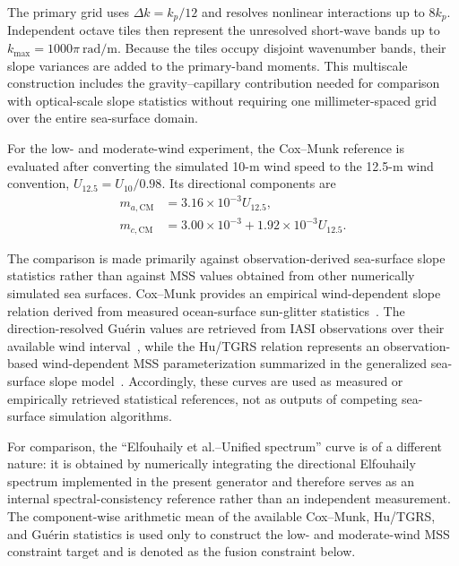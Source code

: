 The primary grid uses $\Delta k=k_p/12$ and resolves nonlinear interactions up to $8k_p$. Independent octave tiles then represent the unresolved short-wave bands up to $k_{\max}=1000\pi~\mathrm{rad/m}$. Because the tiles occupy disjoint wavenumber bands, their slope variances are added to the primary-band moments. This multiscale construction includes the gravity--capillary contribution needed for comparison with optical-scale slope statistics without requiring one millimeter-spaced grid over the entire sea-surface domain.

For the low- and moderate-wind experiment, the Cox--Munk reference is evaluated after converting the simulated 10-m wind speed to the 12.5-m wind convention, $U_{12.5}=U_{10}/0.98$. Its directional components are~\cite{cox1954measurement}
\begin{equation}
\begin{aligned}
m_{a,\mathrm{CM}}&=3.16\times10^{-3}U_{12.5},\\
m_{c,\mathrm{CM}}&=3.00\times10^{-3}
+1.92\times10^{-3}U_{12.5}.
\end{aligned}
\label{eq:cox_munk_directional_mss}
\end{equation}

The comparison is made primarily against observation-derived sea-surface
slope statistics rather than against MSS values obtained from other
numerically simulated sea surfaces. Cox--Munk provides an empirical
wind-dependent slope relation derived from measured ocean-surface
sun-glitter statistics~\cite{cox1954measurement}. The direction-resolved
Gu\'erin values are retrieved from IASI observations over their available
wind interval~\cite{guerin2023seasurfaceslope}, while the Hu/TGRS relation
represents an observation-based wind-dependent MSS parameterization
summarized in the generalized sea-surface slope model~\cite{gao2024generalized}.
Accordingly, these curves are used as measured or empirically retrieved
statistical references, not as outputs of competing sea-surface simulation
algorithms.

For comparison, the ``Elfouhaily et al.--Unified spectrum'' curve is of a
different nature: it is obtained by numerically integrating the directional
Elfouhaily spectrum implemented in the present generator and therefore serves
as an internal spectral-consistency reference rather than an independent
measurement. The component-wise arithmetic mean of the available Cox--Munk,
Hu/TGRS, and Gu\'erin statistics is used only to construct the low- and
moderate-wind MSS constraint target and is denoted as the fusion constraint
below.



